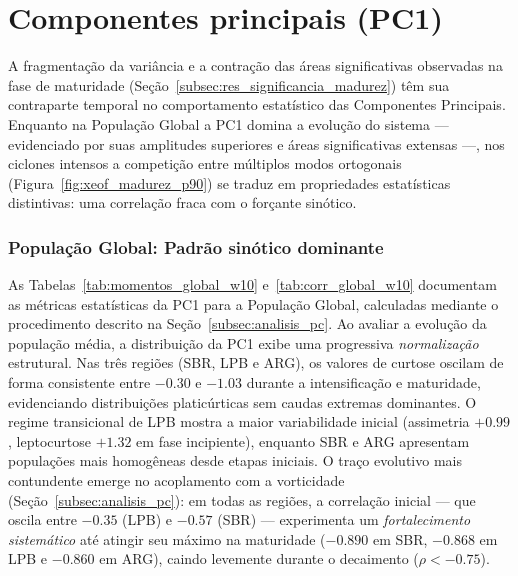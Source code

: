 \section{Componentes principais (PC1)}\label{subsec:res_dinamica_pc1}

A fragmentação da variância e a contração das áreas significativas observadas na fase de maturidade (Seção~\ref{subsec:res_significancia_madurez}) têm sua contraparte temporal no comportamento estatístico das Componentes Principais.
Enquanto na População Global a PC1 domina a evolução do sistema --- evidenciado por suas amplitudes superiores e áreas significativas extensas ---, nos ciclones intensos a competição entre múltiplos modos ortogonais (Figura~\ref{fig:xeof_madurez_p90}) se traduz em propriedades estatísticas distintivas: uma correlação fraca com o forçante sinótico.



\subsubsection{População Global: Padrão sinótico dominante}

As Tabelas~\ref{tab:momentos_global_w10} e~\ref{tab:corr_global_w10} documentam as métricas estatísticas da PC1 para a População Global, calculadas mediante o procedimento descrito na Seção~\ref{subsec:analisis_pc}. Ao avaliar a evolução da população média, a distribuição da PC1 exibe uma progressiva \textit{normalização} estrutural.
Nas três regiões (SBR, LPB e ARG), os valores de curtose oscilam de forma consistente entre $-0.30$ e $-1.03$ durante a intensificação e maturidade, evidenciando distribuições platicúrticas sem caudas extremas dominantes.
O regime transicional de LPB mostra a maior variabilidade inicial (assimetria $+0.99$, leptocurtose $+1.32$ em fase incipiente), enquanto SBR e ARG apresentam populações mais homogêneas desde etapas iniciais.
O traço evolutivo mais contundente emerge no acoplamento com a vorticidade (Seção~\ref{subsec:analisis_pc}): em todas as regiões, a correlação inicial --- que oscila entre $-0.35$ (LPB) e $-0.57$ (SBR) --- experimenta um \textit{fortalecimento sistemático} até atingir seu máximo na maturidade ($-0.890$ em SBR, $-0.868$ em LPB e $-0.860$ em ARG), caindo levemente durante o decaimento ($\rho < -0.75$).



